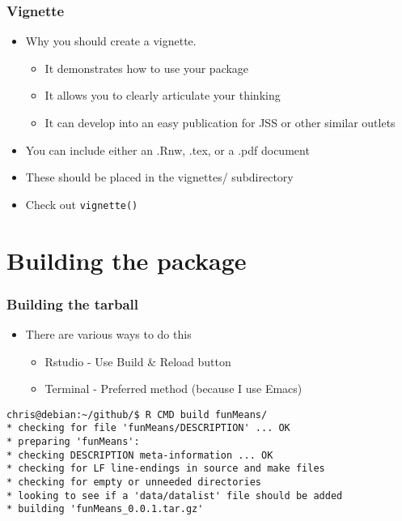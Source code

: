 \documentclass[xcolor=svgnames]{beamer}\usepackage[]{graphicx}\usepackage[]{color}
\begin{document}
\begin{frame}
  \frametitle{Vignette}
  \begin{itemize}
  \item Why you should create a vignette.
    \begin{itemize}
    \item It demonstrates how to use your package
    \item It allows you to clearly articulate your thinking
    \item It can develop into an easy publication for JSS or other similar outlets

    \end{itemize}
  \item You can include either an .Rnw, .tex, or a .pdf document
  \item These should be placed in the vignettes/ subdirectory
        \item Check out \texttt{vignette()}
  \end{itemize}
\end{frame}

\section{Building the package}

\begin{frame}[fragile]
\frametitle{Building the tarball}
   \begin{itemize}
  \item There are various ways to do this
     \begin{itemize}
     \item Rstudio - Use Build \& Reload button
     \item Terminal - Preferred method (because I use Emacs)
     \end{itemize}
  \end{itemize}

  \begin{scriptsize}
  \begin{verbatim}
chris@debian:~/github/$ R CMD build funMeans/
* checking for file 'funMeans/DESCRIPTION' ... OK
* preparing 'funMeans':
* checking DESCRIPTION meta-information ... OK
* checking for LF line-endings in source and make files
* checking for empty or unneeded directories
* looking to see if a 'data/datalist' file should be added
* building 'funMeans_0.0.1.tar.gz'

 \end{verbatim}
\end{scriptsize}
\end{frame}
\end{document}
